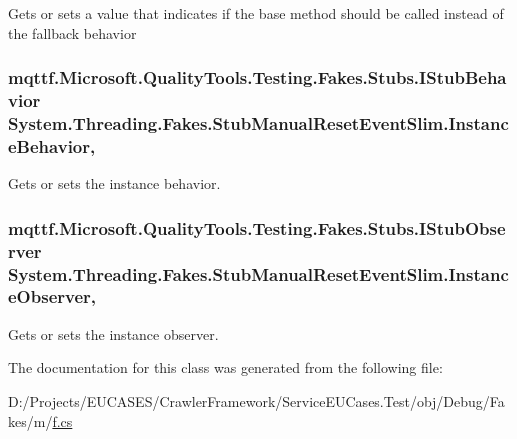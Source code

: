 Gets or sets a value that indicates if the base method should be called instead of the fallback behavior

\hypertarget{class_system_1_1_threading_1_1_fakes_1_1_stub_manual_reset_event_slim_a329bc7f0e96f104c8a51ffd321325462}{
\subsubsection[{Instance\-Behavior}]{\setlength{\rightskip}{0pt plus 5cm}mqttf.\-Microsoft.\-Quality\-Tools.\-Testing.\-Fakes.\-Stubs.\-I\-Stub\-Behavior System.\-Threading.\-Fakes.\-Stub\-Manual\-Reset\-Event\-Slim.\-Instance\-Behavior\hspace{0.3cm}{\ttfamily [get]}, {\ttfamily [set]}}}\label{class_system_1_1_threading_1_1_fakes_1_1_stub_manual_reset_event_slim_a329bc7f0e96f104c8a51ffd321325462}


Gets or sets the instance behavior.

\hypertarget{class_system_1_1_threading_1_1_fakes_1_1_stub_manual_reset_event_slim_a80d45e81bd538cdcdb881f2484528297}{
\subsubsection[{Instance\-Observer}]{\setlength{\rightskip}{0pt plus 5cm}mqttf.\-Microsoft.\-Quality\-Tools.\-Testing.\-Fakes.\-Stubs.\-I\-Stub\-Observer System.\-Threading.\-Fakes.\-Stub\-Manual\-Reset\-Event\-Slim.\-Instance\-Observer\hspace{0.3cm}{\ttfamily [get]}, {\ttfamily [set]}}}\label{class_system_1_1_threading_1_1_fakes_1_1_stub_manual_reset_event_slim_a80d45e81bd538cdcdb881f2484528297}


Gets or sets the instance observer.



The documentation for this class was generated from the following file\-:\begin{DoxyCompactItemize}
\item 
D\-:/\-Projects/\-E\-U\-C\-A\-S\-E\-S/\-Crawler\-Framework/\-Service\-E\-U\-Cases.\-Test/obj/\-Debug/\-Fakes/m/\hyperlink{m_2f_8cs}{f.\-cs}\end{DoxyCompactItemize}

